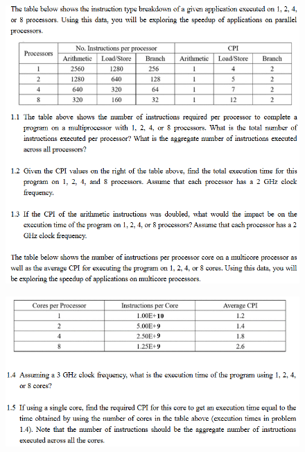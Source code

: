 \documentclass[cn,12pt]{homework}
\begin{document}
\begin{problem}
  \quad
  \begin{figure}[H]
    \centering
    \includegraphics[width=1\textwidth]{./figures/image2.png}
    \label{fig:pro1}
  \end{figure}


  \begin{figure}[H]
    \centering
    \includegraphics[width=1\textwidth]{./figures/image3.png}
    \label{fig:pro1}
  \end{figure}
\end{problem}
\end{document}
